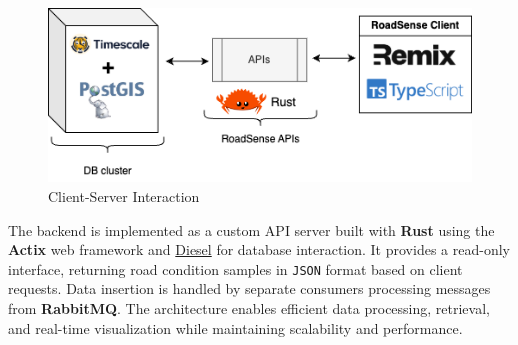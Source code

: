 \begin{figure}[H]
	\centering
	\includegraphics[width=\textwidth]{../../assets/diagrams/client_server_architecture/client_server_arch.png}
	\caption{Client-Server Interaction}
\end{figure}

\noindent The backend is implemented as a custom API server built with \textbf{Rust} using the \textbf{Actix} web framework and \href{https://diesel.rs/}{Diesel} for database interaction. It provides a read-only interface, returning road condition samples in \texttt{JSON} format based on client requests. Data insertion is handled by separate consumers processing messages from \textbf{RabbitMQ}. The architecture enables efficient data processing, retrieval, and real-time visualization while maintaining scalability and performance.
